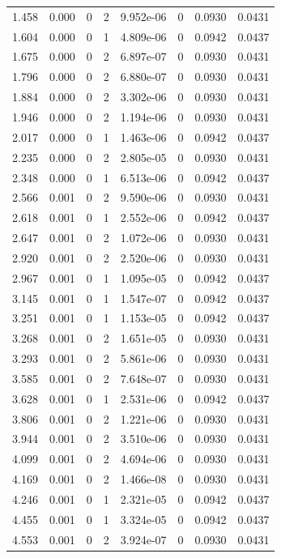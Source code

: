 \documentclass[preview]{standalone}
\begin{document}
{{\begin{tabular}{L{1.2cm}C{1.2cm} C{0.3cm}C{0.5cm} C{1.4cm}C{1.4cm} C{1.4cm}C{1.4cm}}
  1.458  &  0.000  & 0     &  2 &  9.952e-06  & 0  & 0.0930 &  0.0431   \\ 
  1.604  &  0.000  & 0     &  1 &  4.809e-06  & 0  & 0.0942 &  0.0437   \\ 
  1.675  &  0.000  & 0     &  2 &  6.897e-07  & 0  & 0.0930 &  0.0431   \\ 
  1.796  &  0.000  & 0     &  2 &  6.880e-07  & 0  & 0.0930 &  0.0431   \\ 
  1.884  &  0.000  & 0     &  2 &  3.302e-06  & 0  & 0.0930 &  0.0431   \\ 
  1.946  &  0.000  & 0     &  2 &  1.194e-06  & 0  & 0.0930 &  0.0431   \\ 
  2.017  &  0.000  & 0     &  1 &  1.463e-06  & 0  & 0.0942 &  0.0437   \\ 
  2.235  &  0.000  & 0     &  2 &  2.805e-05  & 0  & 0.0930 &  0.0431   \\ 
  2.348  &  0.000  & 0     &  1 &  6.513e-06  & 0  & 0.0942 &  0.0437   \\ 
  2.566  &  0.001  & 0     &  2 &  9.590e-06  & 0  & 0.0930 &  0.0431   \\ 
  2.618  &  0.001  & 0     &  1 &  2.552e-06  & 0  & 0.0942 &  0.0437   \\ 
  2.647  &  0.001  & 0     &  2 &  1.072e-06  & 0  & 0.0930 &  0.0431   \\ 
  2.920  &  0.001  & 0     &  2 &  2.520e-06  & 0  & 0.0930 &  0.0431   \\ 
  2.967  &  0.001  & 0     &  1 &  1.095e-05  & 0  & 0.0942 &  0.0437   \\ 
  3.145  &  0.001  & 0     &  1 &  1.547e-07  & 0  & 0.0942 &  0.0437   \\ 
  3.251  &  0.001  & 0     &  1 &  1.153e-05  & 0  & 0.0942 &  0.0437   \\ 
  3.268  &  0.001  & 0     &  2 &  1.651e-05  & 0  & 0.0930 &  0.0431   \\ 
  3.293  &  0.001  & 0     &  2 &  5.861e-06  & 0  & 0.0930 &  0.0431   \\ 
  3.585  &  0.001  & 0     &  2 &  7.648e-07  & 0  & 0.0930 &  0.0431   \\ 
  3.628  &  0.001  & 0     &  1 &  2.531e-06  & 0  & 0.0942 &  0.0437   \\ 
  3.806  &  0.001  & 0     &  2 &  1.221e-06  & 0  & 0.0930 &  0.0431   \\ 
  3.944  &  0.001  & 0     &  2 &  3.510e-06  & 0  & 0.0930 &  0.0431   \\ 
  4.099  &  0.001  & 0     &  2 &  4.694e-06  & 0  & 0.0930 &  0.0431   \\ 
  4.169  &  0.001  & 0     &  2 &  1.466e-08  & 0  & 0.0930 &  0.0431   \\ 
  4.246  &  0.001  & 0     &  1 &  2.321e-05  & 0  & 0.0942 &  0.0437   \\ 
  4.455  &  0.001  & 0     &  1 &  3.324e-05  & 0  & 0.0942 &  0.0437   \\ 
  4.553  &  0.001  & 0     &  2 &  3.924e-07  & 0  & 0.0930 &  0.0431   \\ 
\hline 
\end{tabular} 

}}
\end{document}
